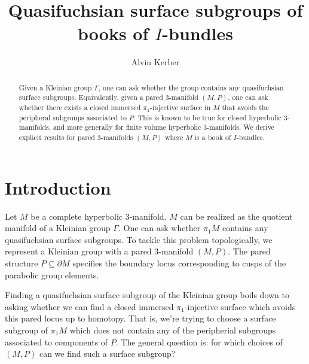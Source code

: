 \documentclass[12pt]{amsart}
\theoremstyle{definition}
\theoremstyle{remark}
\newcommand{\bd}{\partial}
\newcommand{\cin}{\subseteq}
\begin{document}
\title{Quasifuchsian surface subgroups of books of $I$-bundles}

\author{Alvin Kerber}

\begin{abstract}

Given a Kleinian group $\Gamma$, one can ask whether the group contains any
quasifuchsian surface subgroups. Equivalently, given a pared 3-manifold
$(M,P)$, one can ask whether there exists a closed immersed $\pi_1$-injective
surface in $M$ that avoids the peripheral subgroups associated to $P$.  This is
known to be true for closed hyperbolic 3-manifolds, and more generally for
finite volume hyperbolic 3-manifolds. We derive explicit results for pared
3-manifolds $(M,P)$ where $M$ is a book of $I$-bundles.

\end{abstract}

\maketitle
\section{Introduction}

Let $M$ be a complete hyperbolic 3-manifold. $M$ can be realized as the
quotient manifold of a Kleinian group $\Gamma$. One can ask whether $\pi_1M$
contains any quasifuchsian surface subgroups. To tackle this problem
topologically, we represent a Kleinian group with a pared 3-manifold $(M,P)$.
The pared structure $P\cin\bd M$ specifies the boundary locus corresponding to
cusps of the parabolic group elements.

Finding a quasifuchsian surface subgroup of the Kleinian group boils down to
asking whether we can find a closed immersed $\pi_1$-injective surface which
avoids this pared locus up to homotopy. That is, we're trying to choose
a surface subgroup of $\pi_1M$ which does not contain any of the peripherial
subgroups associated to components of $P$. The general question is: for which
choices of $(M,P)$ can we find such a surface subgroup?
\end{document}
